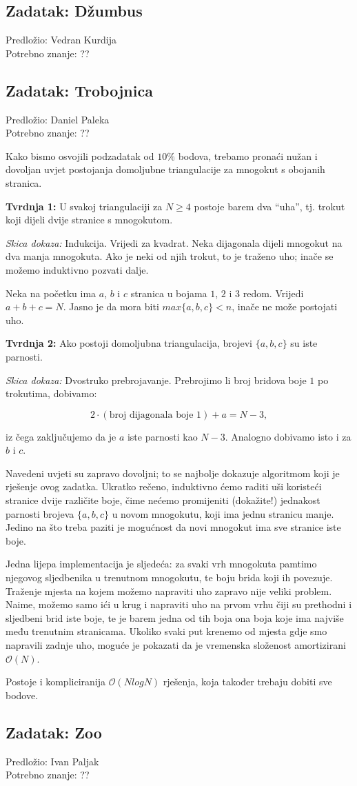 \documentclass[a4paper]{article}
\begin{document}
\subsection*{Zadatak: Džumbus}
\textsf{Predložio: Vedran Kurdija}\\
\textsf{Potrebno znanje: ??}

\subsection*{Zadatak: Trobojnica}
\textsf{Predložio: Daniel Paleka}\\
\textsf{Potrebno znanje: ??}

Kako bismo osvojili podzadatak od $10\%$ bodova, trebamo pronaći nužan i dovoljan uvjet postojanja
domoljubne triangulacije za mnogokut s obojanih stranica.

\textbf{Tvrdnja 1: } \; U svakoj triangulaciji za $N \ge 4$ postoje barem dva ``uha'', tj. trokut
koji dijeli dvije stranice s mnogokutom.

\emph{Skica dokaza: } \; Indukcija. Vrijedi za kvadrat.
Neka dijagonala dijeli mnogokut na dva manja mnogokuta. Ako je neki od njih trokut, to je traženo uho;
inače se možemo induktivno pozvati dalje.

Neka na početku ima $a$, $b$ i $c$ stranica u bojama $1$, $2$ i $3$ redom.
Vrijedi $a+b+c = N$. Jasno je da mora biti $max\{a, b, c\} < n$, inače ne može postojati uho.

\textbf{Tvrdnja 2: } \; Ako postoji domoljubna triangulacija, brojevi $\{a, b, c\}$ su iste parnosti.

\emph{Skica dokaza: } \; Dvostruko prebrojavanje.
Prebrojimo li broj bridova boje $1$ po trokutima, dobivamo:

$$
  2 \cdot (\text{broj dijagonala boje 1}) + a = N - 3,
$$

iz čega zaključujemo da je $a$ iste parnosti kao $N-3$. Analogno dobivamo isto i za $b$ i $c$.

Navedeni uvjeti su zapravo dovoljni; to se najbolje dokazuje algoritmom koji je rješenje ovog zadatka.
Ukratko rečeno, induktivno ćemo raditi uši koristeći stranice dvije različite boje,
čime nećemo promijeniti (dokažite!) jednakost parnosti brojeva $\{a, b, c\}$ u novom mnogokutu, koji
ima jednu stranicu manje.
Jedino na što treba paziti je mogućnost da novi mnogokut ima sve stranice iste boje.

Jedna lijepa implementacija je sljedeća: za svaki vrh mnogokuta pamtimo njegovog sljedbenika u
trenutnom mnogokutu, te boju brida koji ih povezuje. Traženje mjesta na kojem možemo napraviti
uho zapravo nije veliki problem.
Naime, možemo samo ići u krug i napraviti uho na prvom vrhu čiji su prethodni i sljedbeni brid
iste boje, te je barem jedna od tih boja ona boja koje ima najviše među trenutnim stranicama.
Ukoliko svaki put krenemo od mjesta gdje smo napravili zadnje uho, moguće je pokazati da
je vremenska složenost amortizirani $\mathcal{O}(N)$.

Postoje i kompliciranija $\mathcal{O}(N log N)$ rješenja, koja također trebaju dobiti sve bodove.


\subsection*{Zadatak: Zoo}
\textsf{Predložio: Ivan Paljak}\\
\textsf{Potrebno znanje: ??}
\end{document}
